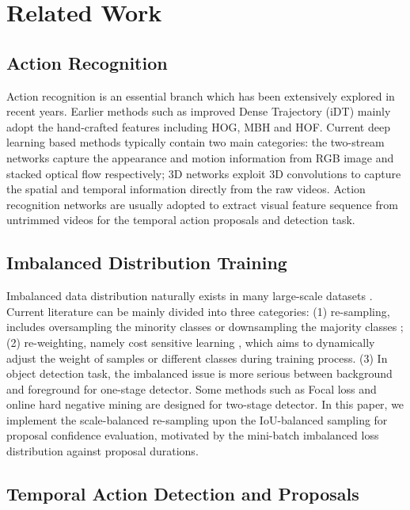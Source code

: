 \documentclass[letterpaper]{article} \usepackage{aaai21}  \usepackage{times}  \usepackage{helvet} \usepackage{courier}  \usepackage[hyphens]{url}  \usepackage{graphicx} \urlstyle{rm} \def\UrlFont{\rm}  \usepackage{natbib}  \usepackage{amsmath,amssymb} \usepackage{caption} \frenchspacing  \usepackage{color}
\begin{document}
\section{Related Work}
\subsection{Action Recognition}
Action recognition is an essential branch which has been extensively explored in recent years. Earlier methods such as improved Dense Trajectory (iDT) \cite{DT,iDT} mainly adopt the hand-crafted features including HOG, MBH and HOF. Current deep learning based methods \cite{C.Feichtenhofer,K.Simonyan,D.Tran,TSN,su2020collaborative} typically contain two main categories: the two-stream networks \cite{C.Feichtenhofer,K.Simonyan} capture the appearance and motion information from RGB image and stacked optical flow respectively; 3D networks \cite{D.Tran,p3d} exploit 3D convolutions to capture the spatial and temporal information directly from the raw videos. Action recognition networks are usually adopted to extract visual feature sequence from untrimmed videos for the temporal action proposals and detection task.

\subsection{Imbalanced Distribution Training} 
Imbalanced data distribution naturally exists in many large-scale datasets \cite{OpenImage,cityscapes,Feng_2018_CVPR_Workshops}. Current literature can be mainly divided into three categories: (1) re-sampling, includes oversampling the minority classes \cite{Andrew,ji2020context} or downsampling the majority classes \cite{Gary,hu2020class}; (2) re-weighting, namely cost sensitive learning \cite{Kate,Cui}, which aims to dynamically adjust the weight of samples or different classes during training process. (3) In object detection task, the imbalanced issue is more serious between background and foreground for one-stage detector. Some methods such as Focal loss \cite{TsungYi} and online hard negative mining \cite{Abhinav} are designed for two-stage detector. In this paper, we implement the scale-balanced re-sampling upon the IoU-balanced sampling for proposal confidence evaluation, motivated by the mini-batch imbalanced loss distribution against proposal durations.

\subsection{Temporal Action Detection and Proposals}
\end{document}

